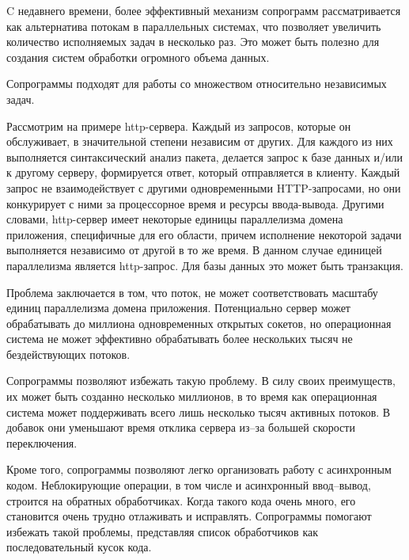 	C недавнего времени, более эффективный механизм сопрограмм рассматривается
	как альтернатива потокам в параллельных системах, что позволяет увеличить количество исполняемых
	задач в несколько раз. Это может быть полезно для создания систем обработки огромного объема данных.
	\par
	Сопрограммы подходят для работы со множеством относительно независимых задач.
	\par
	Рассмотрим на примере http-сервера. Каждый из запросов, которые он обслуживает, в значительной
	степени независим от других. Для каждого из них выполняется синтаксический анализ пакета, делается
	запрос к базе данных и/или к другому серверу, формируется ответ, который отправляется в клиенту. 
	Каждый запрос не взаимодействует с другими одновременными HTTP-запросами, но они конкурирует с ними за процессорное время и ресурсы ввода-вывода.
	Другими словами, http-сервер имеет некоторые единицы параллелизма домена приложения, 
	специфичные для его области, причем исполнение некоторой задачи выполняется независимо от другой в
	то же время. В данном случае единицей параллелизма является http-запрос. Для базы данных это может
	быть транзакция.
	\par
	Проблема заключается в том, что поток, не может соответствовать масштабу единиц параллелизма домена приложения.
	Потенциально сервер может обрабатывать до миллиона
	одновременных открытых сокетов, но операционная система не может эффективно обрабатывать более нескольких
	тысяч не бездействующих потоков.
	\par
	Сопрограммы позволяют избежать такую проблему. В силу своих преимуществ, их может быть
	созданно несколько миллионов, в то время как операционная система может поддерживать всего 
	лишь несколько тысяч активных потоков. В добавок они уменьшают время отклика сервера из--за
	большей скорости переключения.
	\par
	Кроме того, сопрограммы позволяют легко организовать работу с асинхронным  кодом.
	Неблокирующие операции, в том числе и асинхронный ввод--вывод, строится на обратных обработчиках.
	Когда такого кода очень много, его становится очень трудно отлаживать и исправлять.
	Сопрограммы помогают избежать такой проблемы, представляя список обработчиков как
	последовательный кусок кода.
	
\clearpage